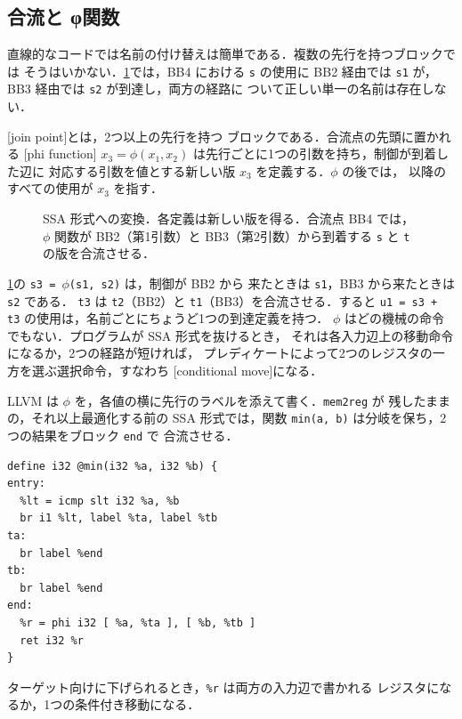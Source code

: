 \documentclass[../main.tex]{subfiles}
\begin{document}
\subsection{合流と φ関数}

直線的なコードでは名前の付け替えは簡単である．複数の先行を持つブロックでは
そうはいかない．\cref{fig:l11-ssa}では，BB4 における \texttt{s} の使用に
BB2 経由では \texttt{s1} が，BB3 経由では \texttt{s2} が到達し，両方の経路に
ついて正しい単一の名前は存在しない．

\begin{definition}
  \label{def:l11-phi}
  [join point]とは，2つ以上の先行を持つ
  ブロックである．合流点の先頭に置かれる
  [phi function]
  $x_3 = \phi(x_1, x_2)$ は先行ごとに1つの引数を持ち，制御が到着した辺に
  対応する引数を値とする新しい版 $x_3$ を定義する．$\phi$ の後では，
  以降のすべての使用が $x_3$ を指す．
\end{definition}

\begin{figure}[tb]
  \centering
  
  \caption{SSA 形式への変換．各定義は新しい版を得る．合流点 BB4 では，
    $\phi$ 関数が BB2（第1引数）と BB3（第2引数）から到着する
    \texttt{s} と \texttt{t} の版を合流させる．}
  \label{fig:l11-ssa}
\end{figure}

\cref{fig:l11-ssa}の \texttt{s3 = $\phi$(s1, s2)} は，制御が BB2 から
来たときは \texttt{s1}，BB3 から来たときは \texttt{s2} である．
\texttt{t3} は \texttt{t2}（BB2）と \texttt{t1}（BB3）を合流させる．すると
\mbox{\texttt{u1 = s3 + t3}} の使用は，名前ごとにちょうど1つの到達定義を持つ．
$\phi$ はどの機械の命令でもない．プログラムが SSA 形式を抜けるとき，
それは各入力辺上の移動命令になるか，2つの経路が短ければ，
プレディケートによって2つのレジスタの一方を選ぶ選択命令，すなわち
[conditional move]になる．

LLVM は $\phi$ を，各値の横に先行のラベルを添えて書く．\texttt{mem2reg} が
残したままの，それ以上最適化する前の SSA 形式では，関数
\texttt{min(a, b)} は分岐を保ち，2つの結果をブロック \texttt{end} で
合流させる．
\begin{lstlisting}[numbers=none]
define i32 @min(i32 %a, i32 %b) {
entry:
  %lt = icmp slt i32 %a, %b
  br i1 %lt, label %ta, label %tb
ta:
  br label %end
tb:
  br label %end
end:
  %r = phi i32 [ %a, %ta ], [ %b, %tb ]
  ret i32 %r
}
\end{lstlisting}
%
ターゲット向けに下げられるとき，\texttt{\%r} は両方の入力辺で書かれる
レジスタになるか，1つの条件付き移動になる．
\end{document}
